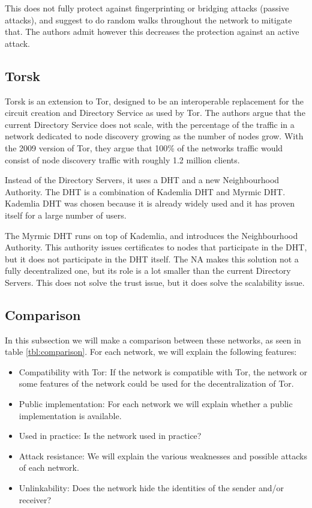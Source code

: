 \documentclass{article}
\begin{document}
		This does not fully protect against fingerprinting or bridging attacks (passive attacks), and suggest to do random walks throughout the network to mitigate that. The authors admit however this decreases the protection against an active attack.
		
	\subsection{Torsk} %
		Torsk \cite{mclachlan2009scalable} is an extension to Tor, designed to be an interoperable replacement for the circuit creation and Directory Service as used by Tor. The authors argue that the current Directory Service does not scale, with the percentage of the traffic in a network dedicated to node discovery growing as the number of nodes grow. With the 2009 version of Tor, they argue that 100\% of the networks traffic would consist of node discovery traffic with roughly 1.2 million clients. 
		
		Instead of the Directory Servers, it uses a DHT and a new Neighbourhood Authority. The DHT is a combination of Kademlia DHT and Myrmic DHT. Kademlia DHT was chosen because it is already widely used and it has proven itself for a large number of users.
		
		The Myrmic DHT runs on top of Kademlia, and introduces the Neighbourhood Authority. This authority issues certificates to nodes that participate in the DHT, but it does not participate in the DHT itself. The NA makes this solution not a fully decentralized one, but its role is a lot smaller than the current Directory Servers. This does not solve the trust issue, but it does solve the scalability issue.

	\subsection{Comparison}
	In this subsection we will make a comparison between these networks, as seen in table \ref{tbl:comparison}. For each network, we will explain the following features:

	\begin{itemize}
		\item{Compatibility with Tor:} If the network is compatible with Tor, the network or some features of the network could be used for the decentralization of Tor.
		\item{Public implementation:} For each network we will explain whether a public implementation is available.
		\item{Used in practice:} Is the network used in practice?
		\item{Attack resistance:} We will explain the various weaknesses and possible attacks of each network.
		\item{Unlinkability:} Does the network hide the identities of the sender and/or receiver?
	\end{itemize}
	
\end{document}
